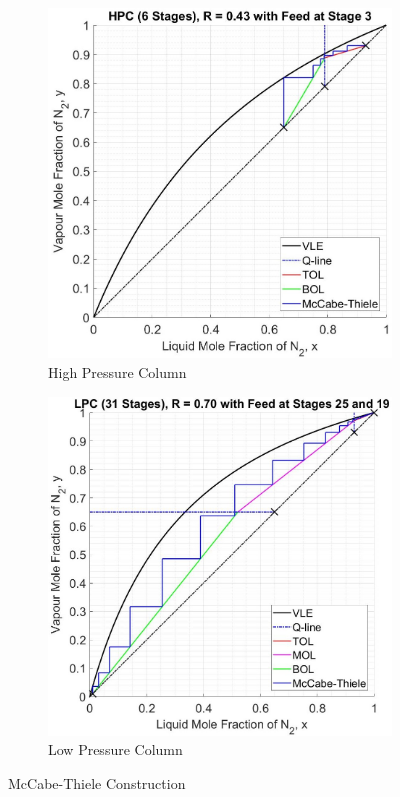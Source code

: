     \begin{figure}[H]
        \begin{subfigure}{0.49\textwidth}
            \includegraphics[width=\linewidth]{airseparation/graphics/HPC_v1.jpg}
            \caption{High Pressure Column}
            \label{fig:HPC_v1}
        \end{subfigure}
        \hspace*{\fill} %
        \begin{subfigure}{0.49\textwidth}
            \includegraphics[width=\linewidth]{airseparation/graphics/LPC_v1.jpg}
            \caption{Low Pressure Column}
            \label{fig:LPC_v1}
        \end{subfigure}
        \caption{McCabe-Thiele Construction}                        \label{fig:mccabe_v1}
    \end{figure}
